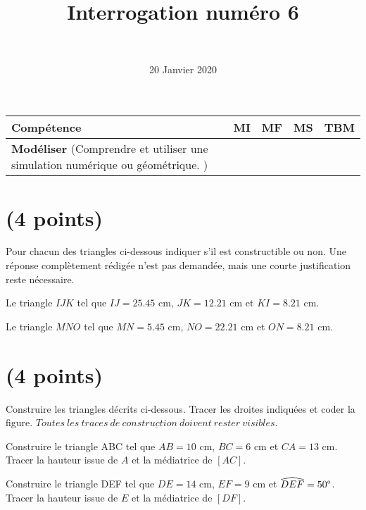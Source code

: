 \documentclass[a4paper,11pt]{exam}
\author{\ }
\date{20 Janvier 2020}
\title{Interrogation num\'ero 6}
\begin{document}
%	

\maketitle


\begin{small}
	\begin{center}
		\begin{tabular}{|@{\ }l@{\ }|@{\ }c@{\ }|@{\ }c@{\ }|@{\ }c@{\ }|@{\ }c@{\ }|}
			\hline
			\textbf{Compétence} & \textbf{MI} & \textbf{MF} & \textbf{MS} & \textbf{TBM} \\
			\hline
			\textbf{Modéliser} (Comprendre et utiliser une simulation numérique ou géométrique. )&  \ \ & \ \ & \ \ & \ \  \\
			\hline	
		\end{tabular}
	\end{center}
\end{small}


\section{(4 points)}

Pour chacun des triangles ci-dessous indiquer s'il est constructible ou non. Une réponse complètement rédigée n'est pas demandée, mais une courte justification reste nécessaire.

\begin{questions}
	\question[2]
	Le triangle $IJK$ tel que $IJ = \num{25.45}$ cm, $JK = \num{12.21}$ cm et $KI = \num{8.21}$ cm.
	
	\fillwithdottedlines{2cm}
	
	\question[2]
	
	Le triangle $MNO$ tel que $MN = \num{5.45}$ cm, $NO = \num{22.21}$ cm et $ON = \num{8.21}$ cm.
	
	\fillwithdottedlines{2cm}
\end{questions}


\section{(4 points)}

Construire les triangles décrits ci-dessous. Tracer les droites indiquées et coder la figure. $\underline{Toutes\  les\  traces\  de\  construction\  doivent\  rester\  visibles.}$


\begin{questions}
	\question[3] Construire le triangle ABC tel que $AB = 10$ cm, $BC = 6$ cm et $CA = 13$ cm. Tracer la hauteur issue de $A$ et la médiatrice de $[AC]$.
	
	\newpage
	
	\question[3] Construire le triangle DEF tel que $DE = 14$ cm, $EF = 9$ cm et $\widehat{DEF} = 50 \degree$. Tracer la hauteur issue de $E$ et la médiatrice de $[DF]$.
\end{questions}


\label{LastPage}
\end{document}
